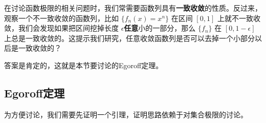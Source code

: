 

在讨论函数极限的相关问题时，我们常需要函数列具有\textbf{一致收敛}的性质。反过来，观察一个不一致收敛的函数列，比如 $\{f_n(x)=x^n\}$ 在区间 $[0, 1]$ 上就不一致收敛，我们会发现如果把区间挖掉长度 $\epsilon$\textbf{任意}小的一部分，那么 $\{f_n\}$ 在 $[0, 1-\epsilon]$ 上总是一致收敛的。这提示我们研究，任意收敛函数列是否可以去掉一个小部分以后是一致收敛的？

答案是肯定的，这就是本节要讨论的Egoroff定理。

\subsection{Egoroff定理}

为方便讨论，我们需要先证明一个引理，证明思路依赖于对集合极限的讨论。










